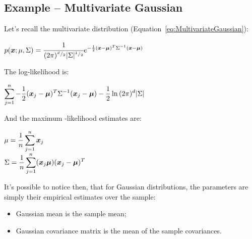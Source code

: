 \subsection{Example -- Multivariate Gaussian}
Let's recall the multivariate distribution (Equation~\ref{eq:MultivariateGaussian}):
\begin{center}
	$\displaystyle p(\bm{x};\mu,\Sigma)=\cfrac{1}{(2\pi)^{{}^{d}/_{2}}\vert \Sigma \vert^{{}^{1}/_{2}}}e^{-\frac{1}{2}(\bm{x}-\bm{\mu})^T\Sigma^{-1}(\bm{x}-\bm{\mu})}$
\end{center}
The log-likelihood is:
\begin{center}
	$\displaystyle \displaystyle\sum_{j=1}^n-\frac{1}{2}(\bm{x}_j-\bm{\mu})^T\Sigma^{-1}(\bm{x}_j-\bm{\mu})-\frac{1}{2}\ln{(2\pi)^d\vert \Sigma \vert}$
\end{center}
And the maximum -likelihood estimates are:
\begin{center}
	$\displaystyle \mu=\frac{1}{n}\displaystyle\sum_{j=1}^n\bm{x}_j$\\
	$\displaystyle \Sigma=\frac{1}{n}\displaystyle\sum_{j=1}^n(\bm{x}_j\bm{\mu})(\bm{x}_j-\bm{\mu})^T$
\end{center}
\vspace{1cm}
It's possible to notice then, that for Gaussian distributions, the parameters are simply their empirical estimates over the sample:
\begin{itemize}
	\item Gaussian mean is the sample mean;
	\item Gaussian covariance matrix is the mean of the sample covariances.
\end{itemize}
%
%
%
